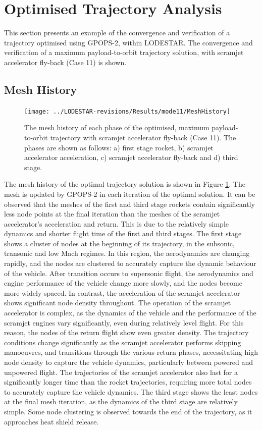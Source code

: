 \section{Optimised Trajectory Analysis}

This section presents an example of the convergence and verification of a trajectory optimised using GPOPS-2, within LODESTAR. The convergence and verification of a maximum payload-to-orbit trajectory solution, with scramjet accelerator fly-back (Case 11) is shown. 

\subsection{Mesh History}
\begin{figure}[ht]
	\centering
	\texttt{[image: ../LODESTAR-revisions/Results/mode11/MeshHistory]}
	\caption{The mesh history of each phase of the optimised, maximum payload-to-orbit trajectory with scramjet accelerator fly-back (Case 11). The phases are shown as follows: a) first stage rocket, b) scramjet accelerator acceleration, c) scramjet accelerator fly-back and d) third stage.}
	\label{fig:MeshHistory}
\end{figure}
The mesh history of the optimal trajectory solution is shown in Figure \ref{fig:MeshHistory}. The mesh is updated by GPOPS-2 in each iteration of the optimal solution. It can be observed that the meshes of the first and third stage rockets contain significantly less node points at the final iteration than the meshes of the scramjet accelerator's acceleration and return. This is due to the relatively simple dynamics and shorter flight time of the first and third stages. The first stage shows a cluster of nodes at the beginning of its trajectory, in the subsonic, transonic and low Mach regimes. In this region, the aerodynamics are changing rapidly, and the nodes are clustered to accurately capture the dynamic behaviour of the vehicle. After transition occurs to supersonic flight, the aerodynamics and engine performance of the vehicle change more slowly, and the nodes become more widely spaced. In contrast, the acceleration of the scramjet accelerator shows significant node density throughout. The operation of the scramjet accelerator is complex, as the dynamics of the vehicle and the performance of the scramjet engines vary significantly, even during relatively level flight. For this reason, the nodes of the return flight show even greater density. The trajectory conditions change significantly as the scramjet accelerator performs skipping manoeuvres, and transitions through the various return phases, necessitating high node density to capture the vehicle dynamics, particularly between powered and unpowered flight. The trajectories of the scramjet accelerator also last for a significantly longer time than the rocket trajectories, requiring more total nodes to accurately capture the vehicle dynamics. The third stage shows the least nodes at the final mesh iteration, as the dynamics of the third stage are relatively simple. Some node clustering is observed towards the end of the trajectory, as it approaches heat shield release. 



